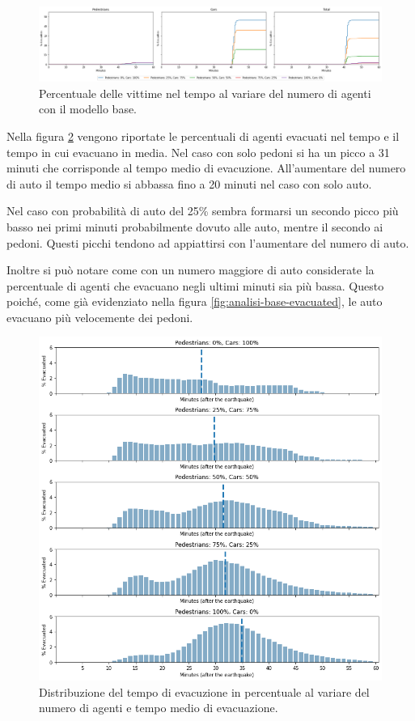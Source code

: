 \begin{figure}[ht]
    \centering
    \includegraphics[width=\textwidth]{images/analisi/base-casualties.png}
    \caption{
        Percentuale delle vittime nel tempo al variare del numero di agenti con il modello base.
    }
    \label{fig:analisi-base-casualties}
\end{figure}

Nella figura \ref{fig:analisi-base-evtimes} vengono riportate le percentuali di agenti evacuati nel tempo e il tempo in cui evacuano in media.
%
Nel caso con solo pedoni si ha un picco a 31 minuti che corrisponde al tempo medio di evacuzione. 
All'aumentare del numero di auto il tempo medio si abbassa fino a 20 minuti nel caso con solo auto.

Nel caso con probabilità di auto del 25\% sembra formarsi un secondo picco più basso nei primi minuti probabilmente dovuto alle auto, mentre il secondo ai pedoni.
Questi picchi tendono ad appiattirsi con l'aumentare del numero di auto.

Inoltre si può notare come con un numero maggiore di auto considerate la percentuale di agenti che evacuano negli ultimi minuti sia più bassa.
Questo poiché, come già evidenziato nella figura \ref{fig:analisi-base-evacuated}, le auto evacuano più velocemente dei pedoni.

\begin{figure}
    \centering
    \includegraphics[width=\textwidth]{images/analisi/base-evtimes.png}
    \caption{
        Distribuzione del tempo di evacuzione in percentuale al variare del numero di agenti e tempo medio di evacuazione.
    }
    \label{fig:analisi-base-evtimes}
\end{figure}

